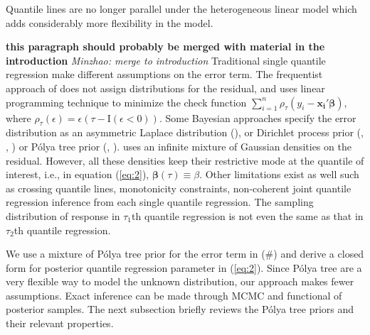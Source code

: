 \documentclass[12pt]{article}
\newcommand{\polya}{P\'{o}lya}
\begin{document}

Quantile lines
are no longer parallel
under the heterogeneous linear model which adds considerably more
flexibility in the model.

{\bf this paragraph should probably be merged with material in the
  introduction} 
{\it Minzhao: merge to introduction}
Traditional single quantile regression make different assumptions on
the error term. The frequentist approach of \citet{koenker1978} does not 
assign distributions for the residual, and uses linear
programming technique to minimize the check function $\sum_{i=1}^n
\rho_{\tau}(y_i - \bm{x_i'\beta})$, where $\rho_{\tau}(\epsilon) =
\epsilon (\tau- \mathrm{I}(\epsilon < 0))$. 
Some Bayesian 
approaches specify the error distribution as an asymmetric Laplace
distribution (\citet{yu2001}), or Dirichlet process prior
(\citet{kottas2001}, \citet{kottas2009},  \citet{taddy2010}) or
\polya{} tree prior (\citet{walker1999}, \citet{hanson2002}). \citet{reich2010}
uses an infinite mixture of Gaussian densities on the 
residual. However, all these densities keep their
restrictive mode at the quantile of interest, i.e., in equation
(\ref{eq:2}), $\bm{\beta}(\tau) \equiv \beta$. Other limitations exist
as well such as crossing quantile lines, monotonicity constraints,
non-coherent joint quantile regression inference from each single
quantile regression. The sampling distribution of response in
$\tau_1$th quantile regression is not even the same as that in
$\tau_2$th quantile regression.

We use a mixture of \polya{} tree prior for the error term in (\#) and
derive a
closed form for posterior quantile regression parameter in
(\ref{eq:2}). 
Since \polya{}
tree are a very flexible way to model the unknown distribution, our
approach makes fewer assumptions. 
Exact
inference can be made through MCMC and functional of posterior
samples. The next subsection briefly reviews the \polya{} tree priors and
their relevant properties.
\end{document}
